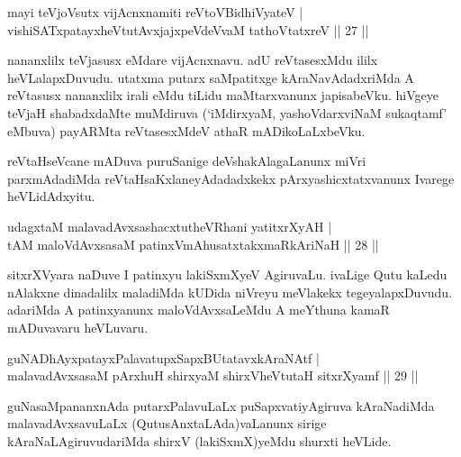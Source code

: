 
\begin{shl}
mayi teVjoV\s sutx vijAcnxnamiti reVtoV\s BidhiVyateV | \\
vishiSATxpatayxheVtutAvxjajxpeVdeVvaM tathoVtatxreV \hfill|| 27 || 
\end{shl}

\begin{artha}
nananxlilx teVjasusx eMdare vijAcnxnavu. adU reVtasesxMdu ililx 
heVLalapxDuvudu. utatxma putarx saMpatitxge kAraNavAdadxriMda A 
reVtasusx nananxlilx irali eMdu tiLidu maMtarxvanunx japisabeVku. 
hiVgeye teVjaH shabadxdaMte muMdiruva (`iMdirxyaM, yashoVdarxviNaM 
sukaqtamf' eMbuva) payARMta reVtasesxMdeV athaR mADikoLaLxbeVku.
\end{artha}


\begin{artha}
reVtaHseVcane mADuva puruSanige deVshakAlagaLanunx miVri parxmAdadiMda 
reVtaHsaKxlaneyAdadadxkekx pArxyashicxtatxvanunx Ivarege heVLidAdxyitu.
\end{artha}


\begin{shl}
udagxtaM malavadAvxsashacxtutheVR\s hani yatitxrXyAH | \\
tAM maloVdAvxsasaM patinxVmAhusatxtakxmaRkAriNaH \hfill|| 28 || 
\end{shl}

\begin{artha}
sitxrXVyara naDuve I patinxyu lakiSxmXyeV AgiruvaLu. ivaLige Qutu 
kaLedu nAlakxne dinadalilx maladiMda kUDida niVreyu meVlakekx 
tegeyalapxDuvudu. adariMda A patinxyanunx maloVdAvxsaLeMdu A meYthuna 
kamaR mADuvavaru heVLuvaru.
\end{artha}


\begin{shl}
guNADhAyxpatayxPalavatupxSapxBUtatavxkAraNAtf | \\
malavadAvxsasaM pArxhuH shirxyaM shirxVheVtutaH sitxrXyamf \hfill|| 29 || 
\end{shl}

\begin{artha}
guNasaMpananxnAda putarxPalavuLaLx puSapxvatiyAgiruva kAraNadiMda malavadAvxsa\-vuLaLx (QutusAnxtaLAda)vaLanunx sirige kAraNaLAgiruvudariMda shirxV (lakiSxmX)yeMdu shurxti heVLide.
\end{artha}

